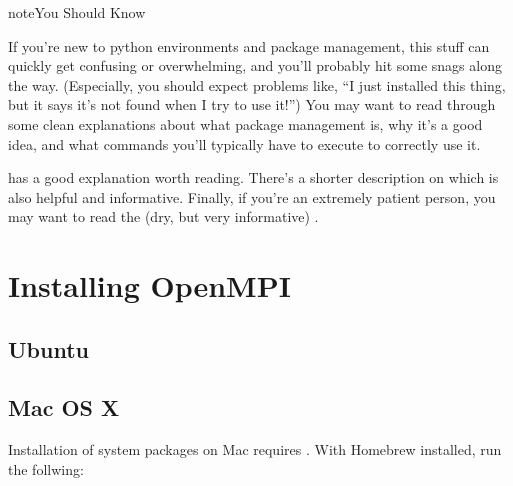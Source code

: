 \documentclass[letterpaper,10pt,english]{sphinxmanual}
\begin{document}
\begin{sphinxadmonition}{note}{You Should Know}

If you’re new to python environments and package management, this stuff can quickly get confusing or overwhelming, and you’ll probably hit some snags along the way. (Especially, you should expect problems like, “I just installed this thing, but it says it’s not found when I try to use it!”) You may want to read through some clean explanations about what package management is, why it’s a good idea, and what commands you’ll typically have to execute to correctly use it.

 has a good explanation worth reading. There’s a shorter description on  which is also helpful and informative. Finally, if you’re an extremely patient person, you may want to read the (dry, but very informative) .
\end{sphinxadmonition}


\section{Installing OpenMPI}
\label{\detokenize{user/installation:installing-openmpi}}

\subsection{Ubuntu}
\label{\detokenize{user/installation:ubuntu}}
\begin{sphinxVerbatim}[commandchars=\\\{\}]
       
\end{sphinxVerbatim}


\subsection{Mac OS X}
\label{\detokenize{user/installation:mac-os-x}}
Installation of system packages on Mac requires . With Homebrew installed, run the follwing:
\end{document}
